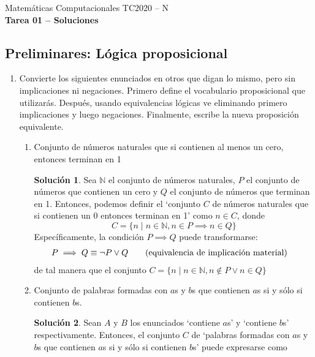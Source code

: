 \documentclass[]{book}
\theoremstyle{definition}
\newtheorem*{sol}{Solución}
\newcommand{\bb}[1]{\mathbb{#1}}
\begin{document}
\begin{center}
{\huge Matemáticas Computacionales TC2020 -- N}\\[1.5ex]
{\large \textbf{Tarea 01 -- Soluciones}\\[1.5ex] %
} %
\end{center}

\vspace{0.2 cm}

\subsection*{Preliminares: Lógica proposicional}

\begin{enumerate}
	\itemsep0.35in

	\item Convierte los siguientes enunciados en otros que digan lo mismo, pero sin implicaciones ni negaciones.
	Primero define el vocabulario proposicional que utilizarás. Después, usando equivalencias lógicas ve eliminando primero implicaciones y luego negaciones.
	Finalmente, escribe la nueva proposición equivalente.
	\begin{enumerate}
		\item Conjunto de números naturales que si contienen al menos un cero, entonces terminan en 1
		\begin{sol}
            Sea $\bb{N}$ el conjunto de números naturales, $P$ el conjunto de números que contienen un cero y $Q$ el conjunto de números que terminan en 1.
            Entonces, podemos definir el `conjunto $C$ de números naturales que si contienen un 0 entonces terminan en 1' como $n \in C$, donde
            $$C = \{n \mid n \in \bb{N}, n \in P \implies n \in Q \}$$
            Específicamente, la condición $P \implies Q$ puede transformarse:
            \begin{align*}
                P \implies Q \equiv \neg P \vee Q & \tag{\text{equivalencia de implicación material}}
            \end{align*}
            de tal manera que el conjunto $C = \{n \mid n \in \bb{N}, n \not \in P \vee n \in Q\}$
        \end{sol}
		\item Conjunto de palabras formadas con $a$s y $b$s que contienen $a$s si y sólo si contienen $b$s.
		\begin{sol}
            Sean $A$ y $B$ los enunciados `contiene $a$s' y `contiene $b$s' respectivamente. Entonces, el conjunto $C$ de `palabras formadas con $a$s y $b$s que contienen $a$s si y sólo si contienen $b$s' puede expresarse como

\end{sol}
\end{enumerate}
\end{enumerate}
\end{document}
